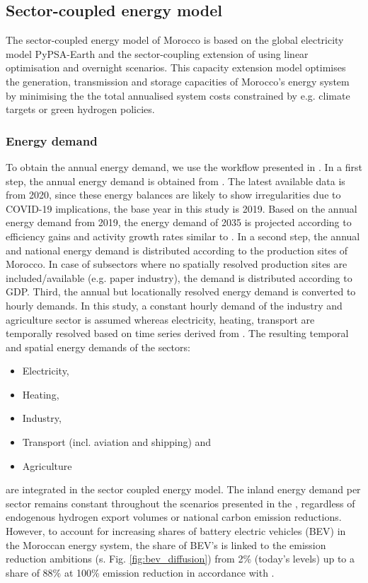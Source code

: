 \subsection*{Sector-coupled energy model}
\label{subsec:moroccan_model}
The sector-coupled energy model of Morocco is based on the global electricity model  PyPSA-Earth \cite{Parzen2023} and the sector-coupling extension of \cite{Abdel-Khalek2024} using linear optimisation and overnight scenarios. This capacity extension model optimises the generation, transmission and storage capacities of Morocco's energy system by minimising the the total annualised system costs constrained by e.g. climate targets or green hydrogen policies.

\subsubsection*{Energy demand}
To obtain the annual energy demand, we use the workflow presented in \cite{Abdel-Khalek2024}. In a first step, the annual energy demand is obtained from \cite{unstats2023}. The latest available data is from 2020, since these energy balances are likely to show irregularities due to COVID-19 implications, the base year in this study is 2019. Based on the annual energy demand from 2019, the energy demand of 2035 is projected according to efficiency gains and activity growth rates similar to \cite{Muller2023}.
In a second step, the annual and national energy demand is distributed according to the production sites of Morocco. %
In case of subsectors where no spatially resolved production sites are included/available (e.g. paper industry), the demand is distributed according to GDP. %
Third, the annual but locationally resolved energy demand is converted to hourly demands. In this study, a constant hourly demand of the industry and agriculture sector is assumed whereas electricity, heating, transport are temporally resolved based on time series derived from \cite{Brown2018a}. The resulting temporal and spatial energy demands of the sectors:
\begin{itemize}
    \item Electricity,
    \item Heating,
    \item Industry,
    \item Transport (incl. aviation and shipping) and
    \item Agriculture
\end{itemize}
are integrated in the sector coupled energy model. The inland energy demand per sector remains constant throughout the scenarios presented in the , regardless of endogenous hydrogen export volumes or national carbon emission reductions. However, to account for increasing shares of battery electric vehicles (BEV) in the Moroccan energy system, the share of BEV's is linked to the emission reduction ambitions (s. Fig. \ref{fig:bev_diffusion}) from 2\% (today's levels) up to a share of 88\% at 100\% emission reduction in accordance with \cite{Rim2021}.

